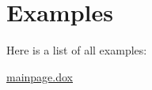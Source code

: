 \section{Examples}
Here is a list of all examples\-:\begin{DoxyCompactItemize}
\item 
\hyperlink{mainpage_8dox-example}{mainpage.\-dox}
\end{DoxyCompactItemize}
